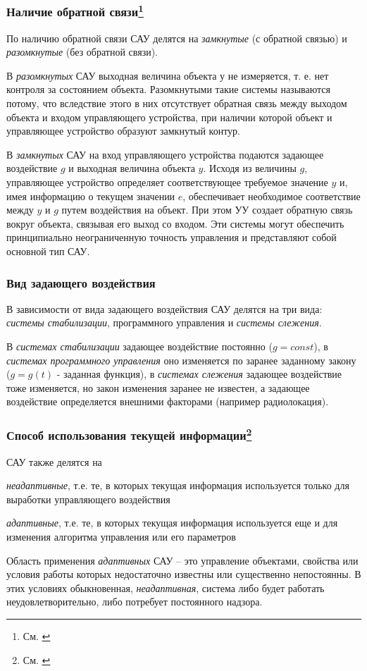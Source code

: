 \documentclass[../../TAU.tex]{subfiles}
\begin{document}
\subsubsection[Наличие обратной связи]{Наличие обратной связи\footnote{См. \cite[стр. 14]{kim:uch}}}
    По наличию обратной связи САУ делятся на {\it замкнутые} (с обратной связью) и {\it разомкнутые} (без обратной связи).\par
    В {\it разомкнутых} САУ выходная величина объекта у не измеряется, т. е. нет контроля за состоянием объекта. Разомкнутыми такие системы называются потому, что вследствие этого в них отсутствует обратная связь между выходом объекта и входом управляющего устройства, при наличии которой объект и управляющее устройство образуют замкнутый контур. \par
    В {\it замкнутых} САУ на вход управляющего устройства подаются задающее воздействие $g$ и выходная величина объекта $y$. Исходя из величины $g$, управляющее устройство определяет соответствующее требуемое значение $y$ и, имея информацию о текущем значении $e$, обеспечивает необходимое соответствие между $y$ и $g$ путем воздействия на объект. При этом УУ создает обратную связь вокруг объекта, связывая его выход со входом. Эти системы могут обеспечить принципиально неограниченную точность управления и представляют собой основной тип САУ. 

\subsubsection{Вид задающего воздействия}
    В зависимости от вида задающего воздействия САУ делятся на три вида: {\it системы стабилизации}, { программного управления} и {\it системы слежения}. \par
    В {\it системах стабилизации} задающее воздействие постоянно ($g = const$), в {\it системах программного управления} оно изменяется по заранее заданному закону ($g = g(t)$ - заданная функция), в {\it системах слежения} задающее воздействие тоже изменяется, но закон изменения заранее не известен, а задающее воздействие определяется внешними факторами (например радиолокация).

\subsubsection[Способ использования текущей информации]{Способ использования текущей информации\footnote{См. \cite[стр. 19-20]{kim:uch}}}
    САУ также делятся на \par
    {\it неадаптивные}, т.е.  те, в которых текущая информация используется только для выработки управляющего воздействия \par
    {\it адаптивные}, т.е. те, в которых текущая информация используется еще и для изменения алгоритма управления или его параметров\\\par
    Область применения {\it адаптивных} САУ – это управление объектами, свойства или условия работы которых недостаточно известны или существенно непостоянны. В этих условиях обыкновенная, {\it неадаптивная}, система либо будет работать неудовлетворительно, либо потребует постоянного надзора. 
\end{document}
